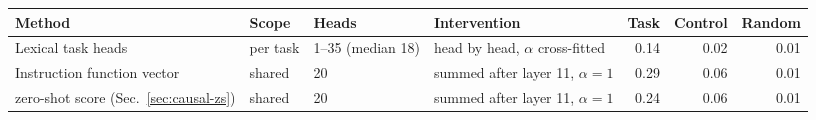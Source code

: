 \begin{tabular}{@{}llllrrr@{}}
\toprule
Method & Scope & Heads & Intervention & Task & Control & Random \\
\midrule
Lexical task heads & per task & 1--35 (median 18) & head by head, $\alpha$ cross-fitted & 0.14 & 0.02 & 0.01 \\
Instruction function vector & shared & 20 & summed after layer 11, $\alpha=1$ & 0.29 & 0.06 & 0.01 \\
\quad zero-shot score (Sec.~\ref{sec:causal-zs}) & shared & 20 & summed after layer 11, $\alpha=1$ & 0.24 & 0.06 & 0.01 \\
\bottomrule
\end{tabular}

